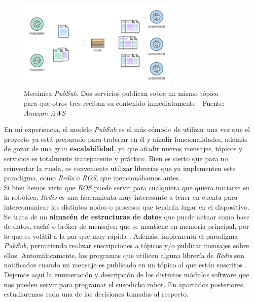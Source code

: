 \begin{figure}[h]
	\centering
	\includegraphics[width=0.7\textwidth]{imagenes/pubsub.png}
	\caption{Mecánica \textit{PubSub}. Dos servicios publican sobre un mismo tópico para que otros tres reciban su contenido inmediatamente - Fuente: \textit{Amazon AWS} \cite{whats-pubsub}}
\end{figure}

En mi experiencia, el modelo \textit{PubSub} es el más cómodo de utilizar una vez que el proyecto ya está preparado para trabajar en él y añadir funcionalidades, además de gozar de una gran \textbf{escalabilidad}, ya que añadir nuevos mensajes, tópicos y servicios es totalmente transparente y práctico. Bien es cierto que para no reinventar la rueda, es conveniente utilizar librerías que ya implementen este paradigma, como \textit{Redis} o \textit{ROS}, que mencionábamos antes.\\

Si bien hemos visto que \textit{ROS} puede servir para cualquiera que quiera iniciarse en la robótica, \textit{Redis} es una herramienta muy interesante a tener en cuenta para intercomunicar los distintos nodos o procesos que tendrán lugar en el dispositivo. Se trata de un \textbf{almacén de estructuras de datos} que puede actuar como base de datos, caché o bróker de mensajes; que se mantiene en memoria principal, por lo que es volátil a la par que muy rápida \cite{redis}. Además, implementa el paradigma \textit{PubSub}, permitiendo realizar suscripciones a tópicos y/o publicar mensajes sobre ellos. Automáticamente, los programas que utilicen alguna librería de \textit{Redis} son notificados cuando un mensaje es publicado en un tópico al que están suscritos \cite{redis-pubsub}.\\

Dejemos aquí la enumeración y descripción de los distintos módulos software que nos pueden servir para programar el susodicho robot. En apartados posteriores estudiaremos cada una de las decisiones tomadas al respecto.\\





















